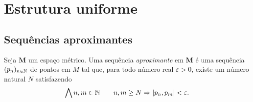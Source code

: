 \begin{comment}
\begin{proposition}
Seja $\bm M$ um espaço métrico e $K,K' \subseteq M$ compactos disjuntos. Então $F$ e $F'$ são metricamente separados.
\end{proposition}
\begin{proof}
Sejam $F,F' \subseteq M$ fechados disjuntos. Mostraremos que $F$ e $F'$ são metricamente separados.
 Queremos mostrar que
	\begin{equation*}
	\dist{F}{F'} = \inf \set{\dist{f}{f'}}{f \in F, f' \in F'} > 0.
	\end{equation*}
Existem sequências $(f_n)_{n \in \N}$ em $F$ e $(f'_n)_{n \in \N}$ em $F'$ tais que
	\begin{equation*}
	\dist{F}{F'} = \lim_{n \conv \infty} \dist{f_n}{f'_n}.
	\end{equation*}
Mas como $F$ e $F'$ são fechados, existem $f \in F$ e $f' \in F'$ tais que $f = \lim_{n \conv \infty} f_n$ e $f' = \lim_{n \conv \infty} f'_n$. Da continuidade da distância,
	\begin{equation*}
	\dist{F}{F'} = \lim_{n \conv \infty} \dist{f_n}{f'_n} = \dist{f}{f'}.
	\end{equation*}
Como $F \cap F' = \emptyset$, então $f \neq f'$, portanto $\dist{f}{f'} > 0$, o que implica que
	\begin{equation*}
	\dist{F}{F'} = \dist{f}{f'} > 0.
	\end{equation*}
\end{proof}

\end{comment}








\section{Estrutura uniforme}

\subsection{Sequências aproximantes}

\begin{definition}
Seja $\bm M$ um espaço métrico. Uma sequência \emph{aproximante} em $\bm M$ é uma sequência $(p_n)_{n \in \mathbb{N}}$ de pontos em $M$ tal que, para todo número real $\varepsilon > 0$, existe um número natural $N$ satisfazendo
	\begin{equation*}
	\bigwedge\nolimits n,m \in \mathbb{N} \qquad n,m \geq N \Rightarrow \left\vert{p_n},{p_m}\right\vert < \varepsilon.
	\end{equation*}
\end{definition}

